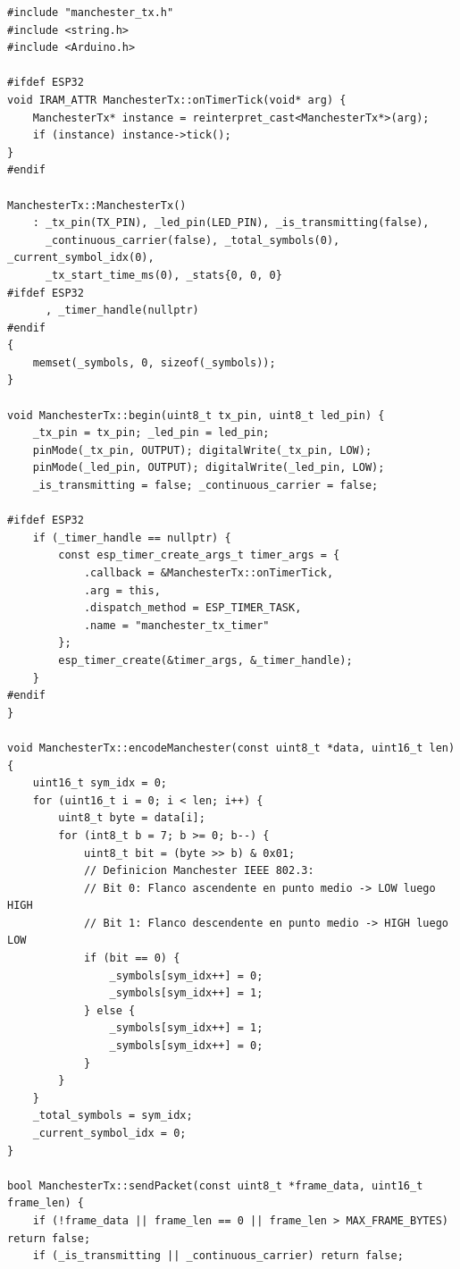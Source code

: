 \begin{lstlisting}[style=customcpp, caption={Codificador Manchester y temporizador de hardware (\texttt{firmware\_tx/manchester\_tx.cpp})}]
#include "manchester_tx.h"
#include <string.h>
#include <Arduino.h>

#ifdef ESP32
void IRAM_ATTR ManchesterTx::onTimerTick(void* arg) {
    ManchesterTx* instance = reinterpret_cast<ManchesterTx*>(arg);
    if (instance) instance->tick();
}
#endif

ManchesterTx::ManchesterTx()
    : _tx_pin(TX_PIN), _led_pin(LED_PIN), _is_transmitting(false),
      _continuous_carrier(false), _total_symbols(0), _current_symbol_idx(0),
      _tx_start_time_ms(0), _stats{0, 0, 0}
#ifdef ESP32
      , _timer_handle(nullptr)
#endif
{
    memset(_symbols, 0, sizeof(_symbols));
}

void ManchesterTx::begin(uint8_t tx_pin, uint8_t led_pin) {
    _tx_pin = tx_pin; _led_pin = led_pin;
    pinMode(_tx_pin, OUTPUT); digitalWrite(_tx_pin, LOW);
    pinMode(_led_pin, OUTPUT); digitalWrite(_led_pin, LOW);
    _is_transmitting = false; _continuous_carrier = false;

#ifdef ESP32
    if (_timer_handle == nullptr) {
        const esp_timer_create_args_t timer_args = {
            .callback = &ManchesterTx::onTimerTick,
            .arg = this,
            .dispatch_method = ESP_TIMER_TASK,
            .name = "manchester_tx_timer"
        };
        esp_timer_create(&timer_args, &_timer_handle);
    }
#endif
}

void ManchesterTx::encodeManchester(const uint8_t *data, uint16_t len) {
    uint16_t sym_idx = 0;
    for (uint16_t i = 0; i < len; i++) {
        uint8_t byte = data[i];
        for (int8_t b = 7; b >= 0; b--) {
            uint8_t bit = (byte >> b) & 0x01;
            // Definicion Manchester IEEE 802.3:
            // Bit 0: Flanco ascendente en punto medio -> LOW luego HIGH
            // Bit 1: Flanco descendente en punto medio -> HIGH luego LOW
            if (bit == 0) {
                _symbols[sym_idx++] = 0;
                _symbols[sym_idx++] = 1;
            } else {
                _symbols[sym_idx++] = 1;
                _symbols[sym_idx++] = 0;
            }
        }
    }
    _total_symbols = sym_idx;
    _current_symbol_idx = 0;
}

bool ManchesterTx::sendPacket(const uint8_t *frame_data, uint16_t frame_len) {
    if (!frame_data || frame_len == 0 || frame_len > MAX_FRAME_BYTES) return false;
    if (_is_transmitting || _continuous_carrier) return false;


\end{lstlisting}
